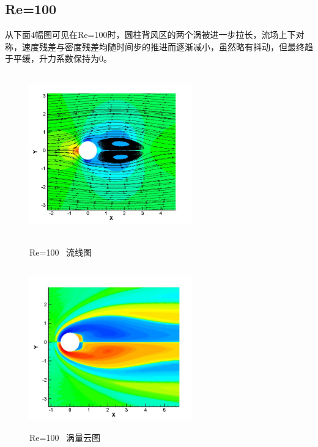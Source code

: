 \documentclass[UTF8]{ctexart}
\begin{document}
\subsection{Re=100}
从下面4幅图可见在Re=100时，圆柱背风区的两个涡被进一步拉长，流场上下对称，速度残差与密度残差均随时间步的推进而逐渐减小，虽然略有抖动，但最终趋于平缓，升力系数保持为0。
\begin{figure}[htbp]\centering
\begin{minipage}{7cm}
\includegraphics[height=7cm,width=7cm]{../pic/Streamline_100.JPG}
\caption{Re=100 \ 流线图}
\end{minipage}
\begin{minipage}{7cm}
\includegraphics[height=7cm,width=7cm]{../pic/Vorticity_100.JPG}
\caption{Re=100 \ 涡量云图}
\end{minipage}


\end{figure}
\end{document}
